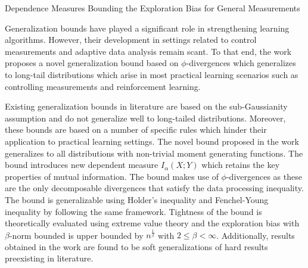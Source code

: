 \documentclass[12pt,letterpaper]{article}
\begin{document}
\begin{center}
  \large{Dependence Measures Bounding the Exploration
  Bias for General Measurements}
\end{center}

Generalization bounds have played a significant role in strengthening learning algorithms. However, their development in settings related to control measurements and adaptive data analysis remain scant. To that end, the work proposes a novel generalization bound based on $\phi$-divergences which generalizes to long-tail distributions which arise in most practical learning scenarios such as controlling measurements and reinforcement learning. 

Existing generalization bounds in literature are based on the sub-Gaussianity assumption and do not generalize well to long-tailed distributions. Moreover, these bounds are based on a number of specific rules which hinder their application to practical learning settings. The novel bound proposed in the work generalizes to all distributions with non-trivial moment generating functions. The bound introduces new dependent measure $I_{\alpha}(X;Y)$ which retains the key properties of mutual information. The bound makes use of $\phi$-divergences as these are the only decomposable divergences that satisfy the data processing inequality. The bound is generalizable using Holder's inequality and Fenchel-Young inequality by following the same framework. Tightness of the bound is theoretically evaluated using extreme value theory and the exploration bias with $\beta$-norm bounded is upper bounded by $n^{\frac{1}{\beta}}$ with $2 \leq\beta<\infty$. Additionally, results obtained in the work are found to be soft generalizations of hard results preexisting in literature. 
\end{document}
